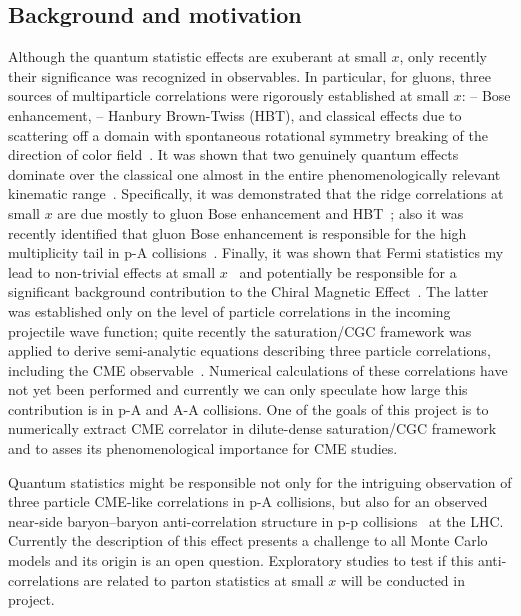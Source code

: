     \vspace{0.5em}
    \subsection{Background and motivation}
    \label{sec:p3b}
	Although the quantum statistic effects are exuberant at small $x$, 
	only recently their significance was recognized in observables. 
	In particular, 
	for gluons, three sources of multiparticle  correlations were rigorously established at 
	small $x$: -- Bose enhancement, -- Hanbury Brown-Twiss (HBT), and classical effects due to 
	scattering off a domain with spontaneous rotational symmetry breaking of the direction of 
	color field~\cite{Dumitru:2014yza,Dumitru:2014vka,Dumitru:2015cfa}. It was shown that two genuinely quantum effects dominate over the classical one 
	almost in the entire phenomenologically relevant kinematic range~\cite{Kovner:2018azs}.
	Specifically, it was demonstrated that the ridge correlations at small $x$ are 
	due mostly to gluon Bose enhancement and 
	HBT~\cite{Kovchegov:2013ewa,Kovchegov:2012nd,Altinoluk:2015uaa,Altinoluk:2018ogz,Kovner:2018fxj,Kovchegov:2018jun};
	also  it was recently identified 
	that gluon Bose enhancement is responsible for the high multiplicity tail in p-A collisions~\cite{Kovner:2018azs}. 
	Finally, it was shown that Fermi statistics my lead to non-trivial effects at small $x$~\cite{Altinoluk:2016vax,Kovner:2017ssr,Kovner:2018vec} 
and potentially be responsible for a significant background contribution to the Chiral Magnetic Effect~\cite{Kovner:2017gab}. 
	The latter was established only on the level of particle correlations in the incoming projectile wave function; 
	quite recently the saturation/CGC framework was applied to derive semi-analytic equations describing 
	three particle correlations, including the CME observable~\cite{Martinez:2018tuf}. Numerical calculations of these 
	correlations have not yet been performed and currently we can only speculate how large 
	this contribution is in p-A and A-A collisions. One of the goals of this project is to 
	numerically extract CME correlator in dilute-dense saturation/CGC framework and to asses its phenomenological importance 
	for CME studies. 

	Quantum statistics might be responsible not only for the intriguing observation of three particle CME-like correlations 
	in p-A collisions, but also for an observed near-side baryon--baryon anti-correlation structure in p-p 
	collisions~\cite{Adam:2016iwf} at the LHC. Currently the description of this effect presents a challenge 
	to all Monte Carlo models and its origin is an open question. Exploratory studies to test if this anti-correlations are 
    related to parton statistics at small $x$ will be conducted in project.  


